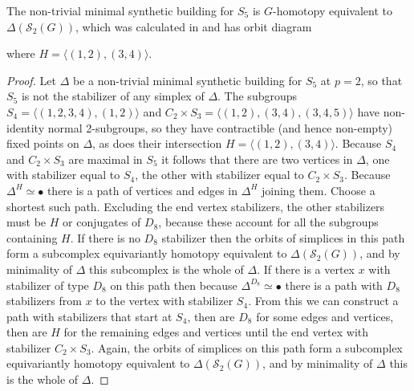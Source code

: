 \documentclass[12pt]{amsart}
\theoremstyle{plain}
\theoremstyle{definition}
\theoremstyle{remark}
\numberwithin{equation}{section}
\def\calS{{\mathcal S}}
\begin{document}
The non-trivial minimal synthetic building for $S_5$ is $G$-homotopy equivalent to $\Delta(\calS_2(G))$, which was calculated in \cite{Web1987-1} and has orbit diagram 
\begin{center}
\end{center}
where $H=\langle (1,2),(3,4)\rangle$.
\begin{proof}
    Let $\Delta$ be a non-trivial minimal synthetic building for $S_5$ at $p=2$, so that $S_5$ is not the stabilizer of any simplex of $\Delta$. The subgroups $S_4=\langle (1,2,3,4),(1,2)\rangle$ and $C_2\times S_3=\langle(1,2),(3,4),(3,4,5)\rangle$ have non-identity normal 2-subgroups, so they have contractible (and hence non-empty) fixed points on $\Delta$, as does their intersection $H=\langle (1,2),(3,4)\rangle$. Because $S_4$ and $C_2\times S_3$ are maximal in $S_5$ it follows that there are two vertices in $\Delta$, one with stabilizer equal to $S_4$, the other with stabilizer equal to $C_2\times S_3$. Because $\Delta^H\simeq\bullet$ there is a path of vertices and edges in $\Delta^H$ joining them. Choose a shortest such path. Excluding the end vertex stabilizers, the other stabilizers must be  $H$ or conjugates of $D_8$, because these account for all the subgroups containing $H$. If there is no $D_8$ stabilizer then the orbits of simplices in this path form a subcomplex equivariantly homotopy equivalent to $\Delta(\calS_2(G))$, and by minimality of $\Delta$ this subcomplex is the whole of $\Delta$. If there is a vertex $x$ with stabilizer of type $D_8$ on this path then because $\Delta^{D_8}\simeq \bullet$ there is a path with $D_8$ stabilizers from $x$ to the vertex with stabilizer $S_4$. From this we can construct a path with stabilizers that start at $S_4$, then are $D_8$ for some edges and vertices, then are $H$ for the remaining edges and vertices until the end vertex with stabilizer $C_2\times S_3$. Again, the orbits of simplices on this path form a subcomplex equivariantly homotopy equivalent to $\Delta(\calS_2(G))$, and by minimality of $\Delta$ this is the whole of $\Delta$.  
\end{proof}


\end{document}
